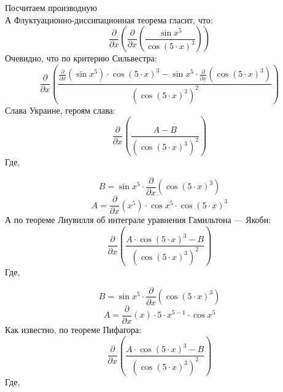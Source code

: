 \documentclass[12pt]{article}
\begin{document}
\newpage                                                  
\Huge                                                     
	Посчитаем производную\\                                
\newline                                                  
\normalfont                                               
\normalsize                                               
А Флуктуационно-диссипационная теорема гласит, что:  \begin{equation}
	\frac{\partial}{\partial x}\left( \frac{\partial}{\partial x}\left( \frac{\sin {x^{5}}}{\cos {\left( 5\cdot x\right) ^{3}}}\right) \right) 
\end{equation}
Очевидно, что по критерию Сильвестра:  \begin{equation}
	\frac{\partial}{\partial x}\left( \frac{\frac{\partial}{\partial x}\left( \sin {x^{5}}\right) \cdot \cos {\left( 5\cdot x\right) ^{3}} - \sin {x^{5}}\cdot \frac{\partial}{\partial x}\left( \cos {\left( 5\cdot x\right) ^{3}}\right) }{\left( \cos {\left( 5\cdot x\right) ^{3}}\right) ^{2}}\right) 
\end{equation}
Слава Украине, героям слава:  \begin{equation}
	\frac{\partial}{\partial x}\left( \frac{A - B}{\left( \cos {\left( 5\cdot x\right) ^{3}}\right) ^{2}}\right) 
\end{equation}
Где, 

\begin{equation}
	B = 
\sin {x^{5}}\cdot \frac{\partial}{\partial x}\left( \cos {\left( 5\cdot x\right) ^{3}}\right) 
\end{equation}
\begin{equation}
	A = 
\frac{\partial}{\partial x}\left( x^{5}\right) \cdot \cos {x^{5}}\cdot \cos {\left( 5\cdot x\right) ^{3}}
\end{equation}
А по теореме Лиувилля об интеграле уравнения Гамильтона — Якоби:  \begin{equation}
	\frac{\partial}{\partial x}\left( \frac{A\cdot \cos {\left( 5\cdot x\right) ^{3}} - B}{\left( \cos {\left( 5\cdot x\right) ^{3}}\right) ^{2}}\right) 
\end{equation}
Где, 

\begin{equation}
	B = 
\sin {x^{5}}\cdot \frac{\partial}{\partial x}\left( \cos {\left( 5\cdot x\right) ^{3}}\right) 
\end{equation}
\begin{equation}
	A = 
\frac{\partial}{\partial x}\left( x\right) \cdot 5\cdot x^{5 - 1}\cdot \cos {x^{5}}
\end{equation}
Как известно, по теореме Пифагора:  \begin{equation}
	\frac{\partial}{\partial x}\left( \frac{A\cdot \cos {\left( 5\cdot x\right) ^{3}} - B}{\left( \cos {\left( 5\cdot x\right) ^{3}}\right) ^{2}}\right) 
\end{equation}
Где, 
\end{document}
